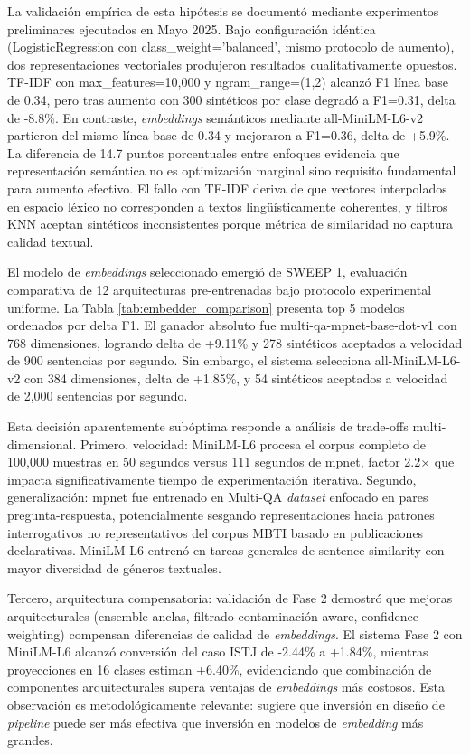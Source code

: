 La validación empírica de esta hipótesis se documentó mediante experimentos preliminares ejecutados en Mayo 2025. Bajo configuración idéntica (LogisticRegression con class\_weight='balanced', mismo protocolo de aumento), dos representaciones vectoriales produjeron resultados cualitativamente opuestos. TF-IDF con max\_features=10,000 y ngram\_range=(1,2) alcanzó F1 línea base de 0.34, pero tras aumento con 300 sintéticos por clase degradó a F1=0.31, delta de -8.8\%. En contraste, \textit{embeddings} semánticos mediante all-MiniLM-L6-v2 partieron del mismo línea base de 0.34 y mejoraron a F1=0.36, delta de +5.9\%. La diferencia de 14.7 puntos porcentuales entre enfoques evidencia que representación semántica no es optimización marginal sino requisito fundamental para aumento efectivo. El fallo con TF-IDF deriva de que vectores interpolados en espacio léxico no corresponden a textos lingüísticamente coherentes, y filtros KNN aceptan sintéticos inconsistentes porque métrica de similaridad no captura calidad textual.

El modelo de \textit{embeddings} seleccionado emergió de SWEEP 1, evaluación comparativa de 12 arquitecturas pre-entrenadas bajo protocolo experimental uniforme. La Tabla \ref{tab:embedder_comparison} presenta top 5 modelos ordenados por delta F1. El ganador absoluto fue multi-qa-mpnet-base-dot-v1 con 768 dimensiones, logrando delta de +9.11\% y 278 sintéticos aceptados a velocidad de 900 sentencias por segundo. Sin embargo, el sistema selecciona all-MiniLM-L6-v2 con 384 dimensiones, delta de +1.85\%, y 54 sintéticos aceptados a velocidad de 2,000 sentencias por segundo.

Esta decisión aparentemente subóptima responde a análisis de trade-offs multi-dimensional. Primero, velocidad: MiniLM-L6 procesa el corpus completo de 100,000 muestras en 50 segundos versus 111 segundos de mpnet, factor 2.2× que impacta significativamente tiempo de experimentación iterativa. Segundo, generalización: mpnet fue entrenado en Multi-QA \textit{dataset} enfocado en pares pregunta-respuesta, potencialmente sesgando representaciones hacia patrones interrogativos no representativos del corpus MBTI basado en publicaciones declarativas. MiniLM-L6 entrenó en tareas generales de sentence similarity con mayor diversidad de géneros textuales.

Tercero, arquitectura compensatoria: validación de Fase 2 demostró que mejoras arquitecturales (ensemble anclas, filtrado contaminación-aware, confidence weighting) compensan diferencias de calidad de \textit{embeddings}. El sistema Fase 2 con MiniLM-L6 alcanzó conversión del caso ISTJ de -2.44\% a +1.84\%, mientras proyecciones en 16 clases estiman +6.40\%, evidenciando que combinación de componentes arquitecturales supera ventajas de \textit{embeddings} más costosos. Esta observación es metodológicamente relevante: sugiere que inversión en diseño de \textit{pipeline} puede ser más efectiva que inversión en modelos de \textit{embedding} más grandes.

